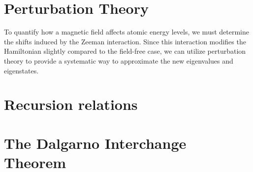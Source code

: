     \section{Perturbation Theory} \label{sec:Perturbation_Theory}
        To quantify how a magnetic field affects atomic energy levels, we must determine the shifts induced by the Zeeman interaction. Since this interaction modifies the Hamiltonian slightly compared to the field-free case, we can utilize perturbation theory to provide a systematic way to approximate the new eigenvalues and eigenstates.
    \section{Recursion relations} \label{sec:Recursion_Relations}
    \section{The Dalgarno Interchange Theorem} \label{sec:Dalgarno_Interchange_Theorem}
    
    